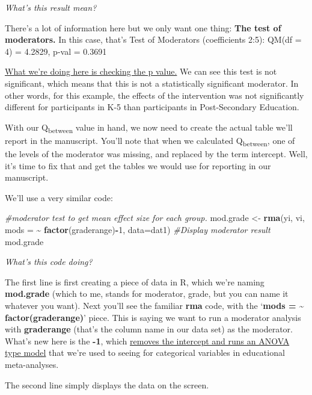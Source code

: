 \documentclass[
]{book}
\newenvironment{Shaded}{\begin{snugshade}}{\end{snugshade}}
\newcommand{\AttributeTok}[1]{\textcolor[rgb]{0.13,0.29,0.53}{#1}}
\newcommand{\CommentTok}[1]{\textcolor[rgb]{0.56,0.35,0.01}{\textit{#1}}}
\newcommand{\DecValTok}[1]{\textcolor[rgb]{0.00,0.00,0.81}{#1}}
\newcommand{\FunctionTok}[1]{\textcolor[rgb]{0.13,0.29,0.53}{\textbf{#1}}}
\newcommand{\NormalTok}[1]{#1}
\newcommand{\OtherTok}[1]{\textcolor[rgb]{0.56,0.35,0.01}{#1}}
\newcommand{\SpecialCharTok}[1]{\textcolor[rgb]{0.81,0.36,0.00}{\textbf{#1}}}
\begin{document}
\emph{What's this result mean?}

There's a lot of information here but we only want one thing: \textbf{The test of moderators.} In this case, that's Test of Moderators (coefficients 2:5): QM(df = 4) = 4.2829, p-val = 0.3691

\ul{What we're doing here is checking the p value.} We can see this test is not significant, which means that this is not a statistically significant moderator. In other words, for this example, the effects of the intervention was not significantly different for participants in K-5 than participants in Post-Secondary Education.

With our Q\textsubscript{between} value in hand, we now need to create the actual table we'll report in the manuscript. You'll note that when we calculated Q\textsubscript{between}, one of the levels of the moderator was missing, and replaced by the term intercept. Well, it's time to fix that and get the tables we would use for reporting in our manuscript.

We'll use a very similar code:

\begin{Shaded}
\begin{Highlighting}[]
\CommentTok{\#moderator test to get mean effect size for each group.}
\NormalTok{mod.grade }\OtherTok{\textless{}{-}} \FunctionTok{rma}\NormalTok{(yi, vi, }\AttributeTok{mods =} \SpecialCharTok{\textasciitilde{}} \FunctionTok{factor}\NormalTok{(graderange)}\SpecialCharTok{{-}}\DecValTok{1}\NormalTok{, }\AttributeTok{data=}\NormalTok{dat1)}
\CommentTok{\#Display moderator result}
\NormalTok{mod.grade}
\end{Highlighting}
\end{Shaded}

\emph{What's this code doing?}

The first line is first creating a piece of data in R, which we're naming \textbf{mod.grade} (which to me, stands for moderator, grade, but you can name it whatever you want). Next you'll see the familiar \textbf{rma} code, with the `\textbf{mods = \textasciitilde{} factor(graderange)}' piece. This is saying we want to run a moderator analysis with \textbf{graderange} (that's the column name in our data set) as the moderator. What's new here is the \textbf{-1}, which \ul{removes the intercept and runs an ANOVA type model} that we're used to seeing for categorical variables in educational meta-analyses.

The second line simply displays the data on the screen.
\end{document}
